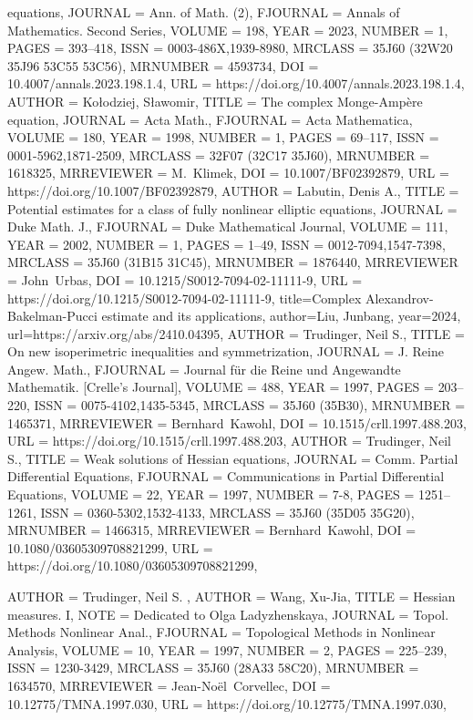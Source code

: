 \documentclass[11pt]{amsart}
\numberwithin{equation}{section}
\numberwithin{equation}{section}
\begin{document}
\begin{bibdiv}
\begin{biblist}
{{              equations},
   JOURNAL = {Ann. of Math. (2)},
  FJOURNAL = {Annals of Mathematics. Second Series},
    VOLUME = {198},
      YEAR = {2023},
    NUMBER = {1},
     PAGES = {393--418},
      ISSN = {0003-486X,1939-8980},
   MRCLASS = {35J60 (32W20 35J96 53C55 53C56)},
  MRNUMBER = {4593734},
       DOI = {10.4007/annals.2023.198.1.4},
       URL = {https://doi.org/10.4007/annals.2023.198.1.4},
}
 {
	AUTHOR = {Ko\l odziej, S\l awomir},
	TITLE = {The complex {M}onge-{A}mp\`ere equation},
	JOURNAL = {Acta Math.},
	FJOURNAL = {Acta Mathematica},
	VOLUME = {180},
	YEAR = {1998},
	NUMBER = {1},
	PAGES = {69--117},
	ISSN = {0001-5962,1871-2509},
	MRCLASS = {32F07 (32C17 35J60)},
	MRNUMBER = {1618325},
	MRREVIEWER = {M.\ Klimek},
	DOI = {10.1007/BF02392879},
	URL = {https://doi.org/10.1007/BF02392879},
}
 {
	AUTHOR = {Labutin, Denis A.},
	TITLE = {Potential estimates for a class of fully nonlinear elliptic
		equations},
	JOURNAL = {Duke Math. J.},
	FJOURNAL = {Duke Mathematical Journal},
	VOLUME = {111},
	YEAR = {2002},
	NUMBER = {1},
	PAGES = {1--49},
	ISSN = {0012-7094,1547-7398},
	MRCLASS = {35J60 (31B15 31C45)},
	MRNUMBER = {1876440},
	MRREVIEWER = {John\ Urbas},
	DOI = {10.1215/S0012-7094-02-11111-9},
	URL = {https://doi.org/10.1215/S0012-7094-02-11111-9},
}
 {
	title={Complex Alexandrov-Bakelman-Pucci estimate and its applications}, 
	author={Liu, Junbang},
	year={2024},
	url={https://arxiv.org/abs/2410.04395}, 
}
 {
	AUTHOR = {Trudinger, Neil S.},
	TITLE = {On new isoperimetric inequalities and symmetrization},
	JOURNAL = {J. Reine Angew. Math.},
	FJOURNAL = {Journal f\"ur die Reine und Angewandte Mathematik. [Crelle's
		Journal]},
	VOLUME = {488},
	YEAR = {1997},
	PAGES = {203--220},
	ISSN = {0075-4102,1435-5345},
	MRCLASS = {35J60 (35B30)},
	MRNUMBER = {1465371},
	MRREVIEWER = {Bernhard\ Kawohl},
	DOI = {10.1515/crll.1997.488.203},
	URL = {https://doi.org/10.1515/crll.1997.488.203},
}
 {
	AUTHOR = {Trudinger, Neil S.},
	TITLE = {Weak solutions of {H}essian equations},
	JOURNAL = {Comm. Partial Differential Equations},
	FJOURNAL = {Communications in Partial Differential Equations},
	VOLUME = {22},
	YEAR = {1997},
	NUMBER = {7-8},
	PAGES = {1251--1261},
	ISSN = {0360-5302,1532-4133},
	MRCLASS = {35J60 (35D05 35G20)},
	MRNUMBER = {1466315},
	MRREVIEWER = {Bernhard\ Kawohl},
	DOI = {10.1080/03605309708821299},
	URL = {https://doi.org/10.1080/03605309708821299},
}

 {
	AUTHOR = {Trudinger, Neil S. },
	AUTHOR = {Wang, Xu-Jia},
	TITLE = {Hessian measures. {I}},
	  NOTE = {Dedicated to Olga Ladyzhenskaya},
   JOURNAL = {Topol. Methods Nonlinear Anal.},
  FJOURNAL = {Topological Methods in Nonlinear Analysis},
    VOLUME = {10},
      YEAR = {1997},
    NUMBER = {2},
     PAGES = {225--239},
      ISSN = {1230-3429},
   MRCLASS = {35J60 (28A33 58C20)},
  MRNUMBER = {1634570},
MRREVIEWER = {Jean-No\"el\ Corvellec},
       DOI = {10.12775/TMNA.1997.030},
       URL = {https://doi.org/10.12775/TMNA.1997.030},
}


\end{biblist}
\end{bibdiv}
\end{document}
